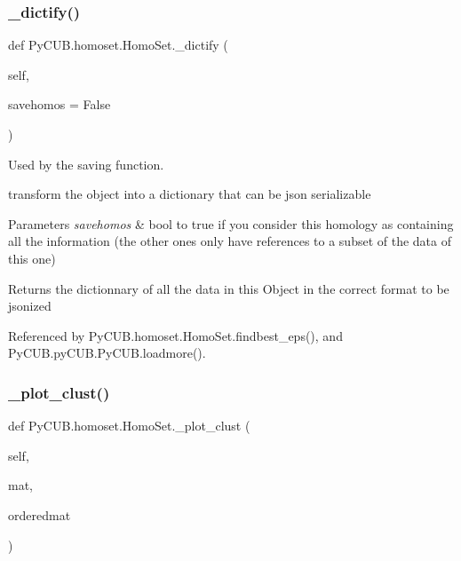 \subsubsection{\texorpdfstring{\+\_\+dictify()}{\_dictify()}}
{\footnotesize\ttfamily def Py\+C\+U\+B.\+homoset.\+Homo\+Set.\+\_\+dictify (\begin{DoxyParamCaption}\item[{}]{self,  }\item[{}]{savehomos = {\ttfamily False} }\end{DoxyParamCaption})\hspace{0.3cm}{\ttfamily [private]}}



Used by the saving function. 

transform the object into a dictionary that can be json serializable


\begin{DoxyParams}{Parameters}
{\em savehomos} & bool to true if you consider this homology as containing all the information (the other ones only have references to a subset of the data of this one)\\
\hline
\end{DoxyParams}
\begin{DoxyReturn}{Returns}
the dictionnary of all the data in this Object in the correct format to be jsonized 
\end{DoxyReturn}


Referenced by Py\+C\+U\+B.\+homoset.\+Homo\+Set.\+findbest\+\_\+eps(), and Py\+C\+U\+B.\+py\+C\+U\+B.\+Py\+C\+U\+B.\+loadmore().

\mbox{\label{class_py_c_u_b_1_1homoset_1_1_homo_set_a795cfd3187026bde3c065aab9fe09642}} 
\subsubsection{\texorpdfstring{\+\_\+plot\+\_\+clust()}{\_plot\_clust()}}
{\footnotesize\ttfamily def Py\+C\+U\+B.\+homoset.\+Homo\+Set.\+\_\+plot\+\_\+clust (\begin{DoxyParamCaption}\item[{}]{self,  }\item[{}]{mat,  }\item[{}]{orderedmat }\end{DoxyParamCaption})\hspace{0.3cm}{\ttfamily [private]}}



